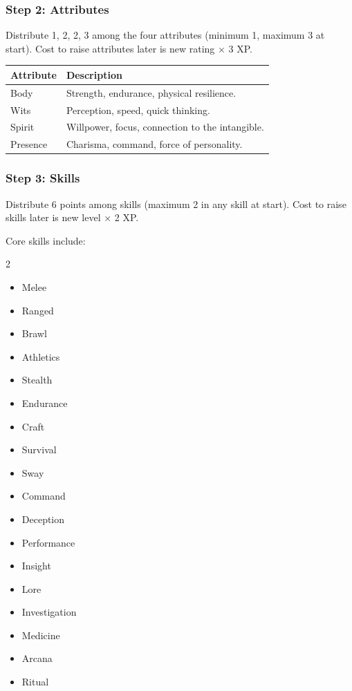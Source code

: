 \subsubsection{Step 2: Attributes}
Distribute 1, 2, 2, 3 among the four attributes (minimum 1, maximum 3 at start). Cost to raise attributes later is new rating × 3 XP.

\begin{tabular}{@{}ll@{}}
\toprule
\textbf{Attribute} & \textbf{Description} \\
\midrule
Body & Strength, endurance, physical resilience. \\
Wits & Perception, speed, quick thinking. \\
Spirit & Willpower, focus, connection to the intangible. \\
Presence & Charisma, command, force of personality. \\
\bottomrule
\end{tabular}

\subsubsection{Step 3: Skills}
Distribute 6 points among skills (maximum 2 in any skill at start). Cost to raise skills later is new level × 2 XP.

Core skills include:
\begin{multicols}{2}
\begin{itemize}
  \item Melee
  \item Ranged
  \item Brawl
  \item Athletics
  \item Stealth
  \item Endurance
  \item Craft
  \item Survival
  \item Sway
  \item Command
  \item Deception
  \item Performance
  \item Insight
  \item Lore
  \item Investigation
  \item Medicine
  \item Arcana
  \item Ritual
\end{itemize}
\end{multicols}

